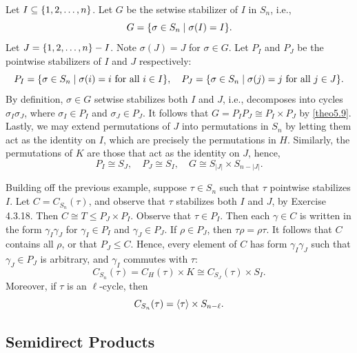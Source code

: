 \ex Let $I \subseteq \{1, 2, \ldots, n\}$. Let $G$ be the setwise stabilizer of $I$ in $S_n$, i.e.,
\[G = \{\sigma \in S_n \mid \sigma(I) = I\}.\]
Let $J = \{1, 2, \ldots, n\} - I$. Note $\sigma(J) = J$ for $\sigma \in G$. Let $P_I$ and $P_J$ be the pointwise stabilizers of $I$ and $J$ respectively:
\[P_I = \{\sigma \in S_n \mid \sigma(i) = i \text{ for all $i \in I$}\}, \quad P_J = \{\sigma \in S_n \mid \sigma(j) = j \text{ for all $j \in J$}\}.\]
By definition, $\sigma \in G$ setwise stabilizes both $I$ and $J$, i.e., decomposes into cycles $\sigma_I\sigma_J$, where $\sigma_I \in P_I$ and $\sigma_J \in P_J$. It follows that $G = P_IP_J \cong P_I \times P_J$ by \autoref{theo5.9}. Lastly, we may extend permutations of $J$ into permutations in $S_n$ by letting them act as the identity on $I$, which are precisely the permutations in $H$. Similarly, the permutations of $K$ are those that act as the identity on $J$, hence,
\[P_I \cong S_J, \quad P_J \cong S_I, \quad G \cong S_{|J|} \times S_{n - |J|}.\]

\ex Building off the previous example, suppose $\tau \in S_n$ such that $\tau$ pointwise stabilizes $I$. Let $C = C_{S_n}(\tau)$, and observe that $\tau$ stabilizes both $I$ and $J$, by Exercise 4.3.18. Then $C \cong T \leq P_J \times P_I$. Observe that $\tau \in P_I$. Then each $\gamma \in C$ is written in the form $\gamma_I \gamma_J$ for $\gamma_I \in P_I$ and $\gamma_J \in P_J$. If $\rho \in P_J$, then $\tau\rho = \rho\tau$. It follows that $C$ contains all $\rho$, or that $P_J \leq C$. Hence, every element of $C$ has form $\gamma_I\gamma_J$ such that $\gamma_J \in P_J$ is arbitrary, and $\gamma_I$ commutes with $\tau$:
\[C_{S_n}(\tau) = C_H(\tau) \times K \cong C_{S_J}(\tau) \times S_I.\]
Moreover, if $\tau$ is an $\ell$-cycle, then
\[C_{S_n}(\tau) = \langle\tau\rangle \times S_{n - \ell}.\]

\newpage

\subsection{Semidirect Products}

